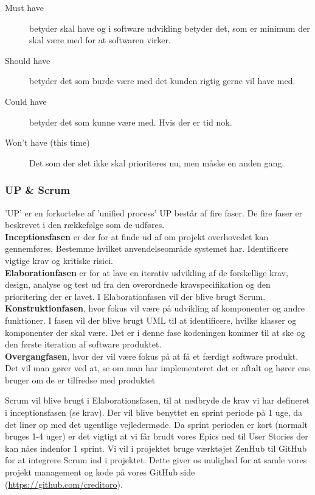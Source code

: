 \noindent
\begin{description}
    \item [Must have] betyder skal have og i software udvikling betyder det, som er minimum der skal være med for at softwaren virker. 
    \item [Should have] betyder det som burde være med det kunden rigtig gerne vil have med.
    \item [Could have] betyder det som kunne være med. Hvis der er tid nok. 
    \item [Won't have (this time)] Det som der slet ikke skal prioriteres nu, men måske en anden gang.
\end{description}


\subsubsection{UP \& Scrum}

'UP' er en forkortelse af 'unified process' UP består af fire faser. De fire faser er beskrevet i den rækkefølge som de udføres. \\

\noindent
\textbf{Inceptionsfasen} er der for at finde ud af om projekt overhovedet kan gennemføres, Bestemme hvilket anvendelseområde systemet har. Identificere vigtige krav og kritiske risici. \\

\noindent
\textbf{Elaborationfasen} er for at lave en iterativ udvikling af de forskellige krav, design, analyse og test ud fra den overordnede kravspecifikation og den prioritering der er lavet. I Elaborationfasen vil der blive brugt Scrum. \\

\noindent
\textbf{Konstruktionfasen}, hvor fokus vil være på udvikling af komponenter og andre funktioner.
I fasen vil der blive brugt UML til at identificere, hvilke klasser og komponenter der skal være. Det er i denne fase kodeningen kommer til at ske og den første iteration af software produktet.  \\

\noindent
\textbf{Overgangfasen}, hvor der vil være fokus på at få et færdigt software produkt.
Det vil man gører ved at, se om man har implementeret det er aftalt og hører ens bruger om de er tilfredse med produktet

Scrum vil blive brugt i Elaborationsfasen, til at nedbryde de krav vi har defineret i inceptionsfasen (se krav). Der vil blive benyttet en sprint periode på 1 uge, da det liner op med det ugentlige vejledermøde. Da sprint perioden er kort (normalt bruges 1-4 uger) er det vigtigt at vi får brudt vores Epics ned til User Stories der kan nåes indenfor 1 sprint.
Vi vil i projektet bruge værktøjet ZenHub til GitHub for at integrere Scrum ind i projektet.
Dette giver os mulighed for at samle vores projekt management og kode på vores GitHub side (\url{https://github.com/creditoro}).

